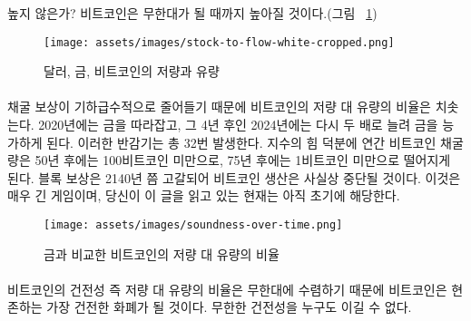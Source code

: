 \begin{comment}	
	How high? Well, it turns out that Bitcoin will get infinitely hard (see
	Figure~\ref{fig:stock-to-flow-white-cropped}).
\end{comment}
높지 않은가? 비트코인은 무한대가 될 때까지 높아질 것이다.(그림 ~\ref{fig:stock-to-flow-white-cropped})

\begin{figure}
	\texttt{[image: assets/images/stock-to-flow-white-cropped.png]}
	\caption{달러, 금, 비트코인의 저량과 유량}
	\label{fig:stock-to-flow-white-cropped}
\end{figure}

\paragraph{}
\begin{comment}	
	Due to an exponential decrease of the mining reward, the flow of new
	bitcoin will diminish resulting in a sky-rocketing stock-to-flow ratio.
	It will catch up to gold in 2020, only to surpass it four years later by
	doubling its soundness again. Such a doubling will occur 32 times in
	total. Thanks to the power of exponentials, the number of bitcoin mined
	per year will drop below 100 bitcoin in 50 years and below 1 bitcoin in
	75 years. The global faucet which is the block reward will dry up
	somewhere around the year 2140, effectively stopping the production of
	bitcoin. This is a long game. If you are reading this, you are still
	early.
\end{comment}
채굴 보상이 기하급수적으로 줄어들기 때문에 비트코인의 저량 대 유량의 비율은 치솟는다.
2020년에는 금을 따라잡고, 그 4년 후인 2024년에는 다시 두 배로 늘려 금을 능가하게 된다.
이러한 반감기는 총 32번 발생한다.
지수의 힘 덕분에 연간 비트코인 채굴량은 50년 후에는 100비트코인 미만으로, 75년 후에는 1비트코인 미만으로 떨어지게 된다.
블록 보상은 2140년 쯤 고갈되어 비트코인 생산은 사실상 중단될 것이다. 
이것은 매우 긴 게임이며, 당신이 이 글을 읽고 있는 현재는 아직 초기에 해당한다.

\begin{figure}
	\texttt{[image: assets/images/soundness-over-time.png]}
	\caption{금과 비교한 비트코인의 저량 대 유량의 비율}
	\label{fig:soundness-over-time}
\end{figure}

\paragraph{}
\begin{comment}	
	As bitcoin approaches infinite stock to flow ratio it will be the
	soundest money in existence. Infinite soundness is hard to beat.
\end{comment}
비트코인의 건전성 즉 저량 대 유량의 비율은 무한대에 수렴하기 때문에
비트코인은 현존하는 가장 건전한 화폐가 될 것이다.
무한한 건전성을 누구도 이길 수 없다.

